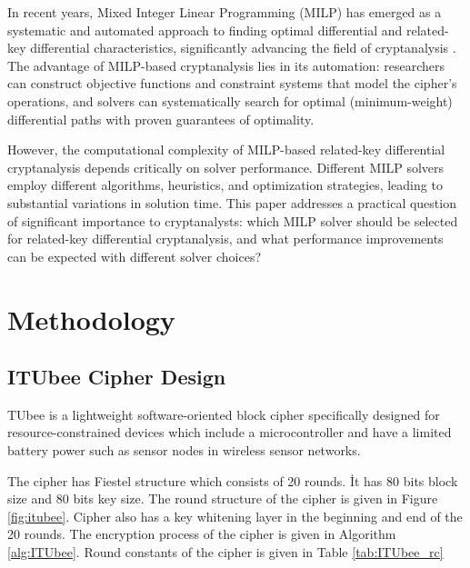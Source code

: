 \documentclass[11pt,a4paper]{article}
\begin{document}
In recent years, Mixed Integer Linear Programming (MILP) has emerged as a systematic and automated approach to finding optimal differential and related-key differential characteristics, significantly advancing the field of cryptanalysis \cite{mouha2012constraint}. The advantage of MILP-based cryptanalysis lies in its automation: researchers can construct objective functions and constraint systems that model the cipher's operations, and solvers can systematically search for optimal (minimum-weight) differential paths with proven guarantees of optimality.

However, the computational complexity of MILP-based related-key differential cryptanalysis depends critically on solver performance. Different MILP solvers employ different algorithms, heuristics, and optimization strategies, leading to substantial variations in solution time. This paper addresses a practical question of significant importance to cryptanalysts: which MILP solver should be selected for related-key differential cryptanalysis, and what performance improvements can be expected with different solver choices?

\section{Methodology}

\subsection{ITUbee Cipher Design}

TUbee \cite{karakocc2013itubee} is a lightweight software-oriented block cipher specifically designed for resource-constrained devices which include a microcontroller and have a limited battery power such as sensor nodes in wireless sensor networks.

The cipher has Fiestel structure which consists of 20 rounds. İt has 80 bits block size and 80 bits key size. The round structure of the cipher is given in Figure \ref{fig:itubee}. Cipher also has a key whitening layer in the beginning and end of the 20 rounds. The encryption process of the cipher is given in Algorithm \ref{alg:ITUbee}. Round constants of the cipher is given in Table \ref{tab:ITUbee_rc} 
\end{document}

